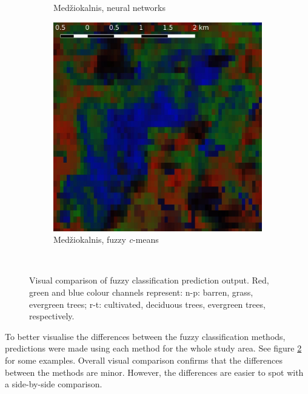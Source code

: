 \documentclass[a4paper,12pt]{scrbook}
\begin{document}
\begin{figure}
\begin{subfigure}[t]{.24\textwidth}
    \caption{Med\v{z}iokalnis, neural networks}
  \end{subfigure} \hfill
  \begin{subfigure}[t]{.24\textwidth}
    \includegraphics[width=\textwidth]{thesis-figures/figures-qgis/medziokalnis-cm}
    \caption{Med\v{z}iokalnis, fuzzy \textit{c}-means}
    \label{subfig-medziokalnis-cm}
  \end{subfigure} \
  \caption{Visual comparison of fuzzy classification prediction output. Red, green and blue colour channels represent: n-p: barren, grass, evergreen trees; r-t: cultivated, deciduous trees, evergreen trees, respectively.}
  \label{fig-visualcomparison}
\end{figure}

To better visualise the differences between the fuzzy classification methods, predictions were made using each method for the whole study area. See figure \ref{fig-visualcomparison} for some examples. Overall visual comparison confirms that the differences between the methods are minor. However, the differences are easier to spot with a side-by-side comparison.
\end{document}
